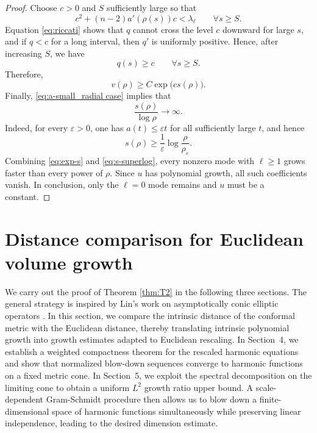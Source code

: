 \documentclass[12pt]{amsart}
\theoremstyle{plain}
\theoremstyle{definition}
\theoremstyle{remark}     %
\numberwithin{equation}{section}
\begin{document}
\begin{proof}
Choose $c>0$ and $S$ sufficiently large so that
\[
 c^2+(n-2)a'(\rho(s))c<\lambda_\ell
 \qquad \forall s\ge S.
\]
Equation \cref{eq:riccati} shows that $q$ cannot cross the level $c$ downward for large $s$, and if $q<c$ for a long interval, then $q'$ is uniformly positive. Hence, after increasing $S$, we have
\[
 q(s)\ge c
 \qquad \forall s\ge S.
\]
Therefore,
\begin{equation}\label{eq:exp-s}
 v(\rho)\ge C\exp\bigl(c s(\rho)\bigr).
\end{equation}
Finally, \cref{eq:a-small_radial case} implies that
\begin{equation}\label{eq:s-superlog}
 \frac{s(\rho)}{\log\rho}\to\infty.
\end{equation}
Indeed, for every $\varepsilon>0$, one has $a(t)\le\varepsilon t$ for all sufficiently large $t$, and hence
\[
 s(\rho)\ge\frac1\varepsilon\log\frac{\rho}{\rho_\varepsilon}.
\]
Combining \cref{eq:exp-s} and \cref{eq:s-superlog}, every nonzero mode with $\ell\ge1$ grows faster than every power of $\rho$.  Since $u$ has polynomial growth, all such coefficients vanish.  
In conclusion, only the $\ell=0$ mode remains and $u$ must be a constant.
\end{proof}

\section{Distance comparison for Euclidean volume growth}

We carry out the proof of Theorem \ref{thm:T2} in the following three sections. The general strategy is inspired by Lin's work on asymptotically conic elliptic operators \cite{L}. 
In this section, we compare the intrinsic distance of the conformal metric with the Euclidean distance, thereby translating intrinsic polynomial growth into growth estimates adapted to Euclidean rescaling. 
In Section~4, we establish a weighted compactness theorem for the rescaled harmonic equations and show that normalized blow-down sequences converge to harmonic functions on a fixed metric cone.
In Section~5, we exploit the spectral decomposition  on the limiting cone to obtain a uniform $L^2$ growth ratio upper bound. A scale-dependent Gram-Schmidt procedure then allows us to blow down a finite-dimensional space of harmonic functions simultaneously while preserving linear independence, leading to the desired dimension estimate.
\end{document}
